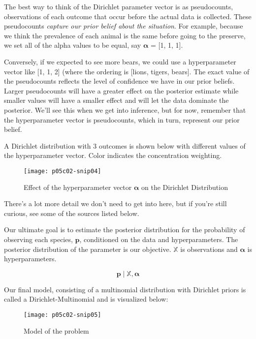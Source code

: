 The best way to think of the Dirichlet parameter vector is as pseudocounts, observations of each outcome that occur before the actual data is collected. These pseudocounts \textit{capture our prior belief about the situation}. For example, because we think the prevalence of each animal is the same before going to the preserve, we set all of the alpha values to be equal, say  $\boldsymbol {\alpha }$ = [1, 1, 1].

Conversely, if we expected to see more bears, we could use a hyperparameter vector like [1, 1, 2] (where the ordering is [lions, tigers, bears]. The exact value of the pseudocounts reflects the level of confidence we have in our prior beliefs. Larger pseudocounts will have a greater effect on the posterior estimate while smaller values will have a smaller effect and will let the data dominate the posterior. We'll see this when we get into inference, but for now, remember that the hyperparameter vector is pseudocounts, which in turn, represent our prior belief.

A Dirichlet distribution with 3 outcomes is shown below \cite{FrancisTsengBayesianLearning2019} with different values of the hyperparameter vector. Color indicates the concentration weighting.

    \begin{figure*}[h]
        \texttt{[image: p05c02-snip04]}
        \caption{Effect of the hyperparameter vector $\boldsymbol {\alpha }$ on the Dirichlet Distribution}
    \end{figure*}

There's a lot more detail we don't need to get into here, but if you're still curious, see some of the sources listed below.

Our ultimate goal is to estimate the posterior distribution for the probability of observing each species, $\mathbf {p}$, conditioned on the data and hyperparameters. The posterior distribution of the parameter is our objective. $\mathbb {X}$ is observations and $\boldsymbol {\alpha }$ is hyperparameters.

\begin{equation}
    \mathbf {p}\mid \mathbb {X} ,{\boldsymbol {\alpha }}
\end{equation}

Our final model, consisting of a multinomial distribution with Dirichlet priors is called a Dirichlet-Multinomial and is visualized below:

\begin{figure*}[h]
    \texttt{[image: p05c02-snip05]}
    \caption{Model of the problem}
\end{figure*}

